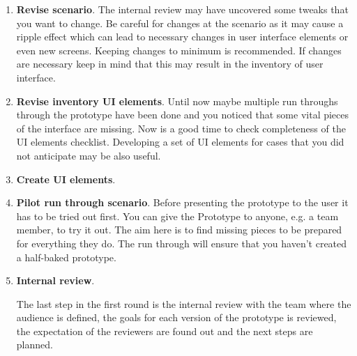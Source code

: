 \begin{enumerate}
	\item \textbf{Revise scenario}. The internal review may have uncovered some tweaks that you want to change. Be careful for changes at the scenario as it may cause a ripple effect which can lead to necessary changes in user interface elements or even new screens. Keeping changes to minimum is recommended. If changes are necessary keep in mind that this may result in the inventory of user interface.
	\item \textbf{Revise inventory UI elements}.
	Until now maybe multiple run throughs through the prototype have been done and you noticed that some vital pieces of the interface are missing. Now is a good time to check completeness of the UI elements checklist. Developing a set of UI elements for cases that you did not anticipate may be also useful.
	\item \textbf{Create UI elements}.
	
	
	\item \textbf{Pilot run through scenario}. Before presenting the prototype to the user it has to be tried out first. You can give the Prototype to anyone, e.g. a team member, to try it out. The aim here is to find missing pieces to be prepared for everything they do. The run through will ensure that you haven't created a half-baked prototype.
	
	\item \textbf{Internal review}. 
	
	The last step in the first round is the internal review with the team where the audience is defined, the goals for each version of the prototype is reviewed, the expectation of the reviewers are found out and the next steps are planned.
	

\end{enumerate}
